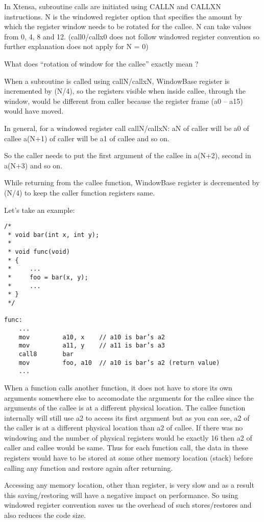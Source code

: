 In Xtensa, subroutine calls are initiated using CALLN and CALLXN instructions. N is the windowed register option that specifies the amount by which the register window needs to be rotated for the callee. N can take values from 0, 4, 8 and 12. (call0/callx0 does not follow windowed register convention so further explanation does not apply for N = 0)

What does “rotation of window for the callee” exactly mean ?

When a subroutine is called using callN/callxN, WindowBase register is incremented by (N/4), so the registers visible when inside callee, through the window, would be different from caller because the register frame (a0 -- a15) would have moved.

In general, for a windowed register call callN/callxN:
aN of caller will be a0 of callee
a(N+1) of caller will be a1 of callee and so on.

So the caller needs to put the first argument of the callee in a(N+2), second in a(N+3) and so on.

While returning from the callee function, WindowBase register is decremented by (N/4) to keep the caller function registers same.

Let’s take an example:

\begin{verbatim}
/*
 * void bar(int x, int y);
 * 
 * void func(void)
 * {
 *     ...
 *     foo = bar(x, y);
 *     ...
 * }
 */

func:
    ...
    mov         a10, x    // a10 is bar’s a2
    mov         a11, y    // a11 is bar’s a3
    call8       bar
    mov         foo, a10  // a10 is bar’s a2 (return value)
    ...
\end{verbatim}

 When a function calls another function, it does not have to store its own arguments somewhere else to accomodate the arguments for the callee since the arguments of the callee is at a different physical location. The callee function internally will still use a2 to access its first argument but as you can see, a2 of the caller is at a different physical location than a2 of callee. If there was no windowing and the number of physical registers would be exactly 16 then a2 of caller and callee would be same. Thus for each function call, the data in these registers would have to be stored at some other memory location (stack) before calling any function and restore again after returning.

Accessing any memory location, other than register, is very slow and as a result this saving/restoring will have a negative impact on performance. So using windowed register convention saves us the overhead of such stores/restores and also reduces the code size.

